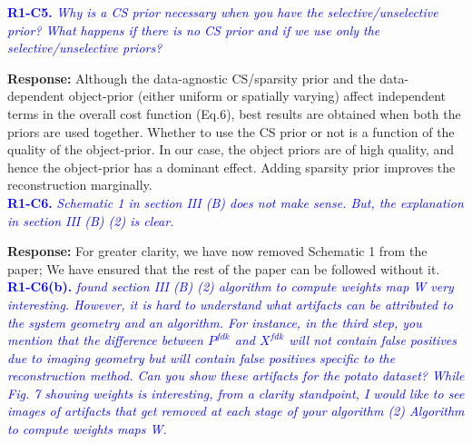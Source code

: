 \documentclass{article}
\begin{document}
\textcolor{blue}{\textbf{R1-C5.} \textit{ Why is a CS prior necessary when you have the selective/unselective prior? What happens if there is no CS prior and if we use only the selective/unselective priors?}}

\textbf{Response:} Although the data-agnostic CS/sparsity  prior and the data-dependent object-prior  (either uniform or spatially varying) affect independent terms in the overall cost function (Eq.6), best results are obtained when both the priors are used together. Whether to use the CS prior or not is a function of the quality of the object-prior. In our case, the object priors are of high quality, and hence the object-prior has a dominant effect. Adding sparsity prior improves the reconstruction marginally.\\

\textcolor{blue}{\textbf{R1-C6.}\textit{ Schematic 1 in section III (B) does not make sense. But, the explanation in section III (B) (2) is clear.}}

\textbf{Response:}  For greater clarity, we have now removed Schematic 1 from the paper; We have  ensured that the rest of the paper can be followed without it.\\

\textcolor{blue}{\textbf{R1-C6(b).}\textit{ found section III (B) (2) algorithm to compute weights map W very interesting. However, it is hard to understand what artifacts can be attributed to the system geometry and an algorithm. For instance, in the third step, you mention that the difference between $P^{fdk}$ and $X^{fdk}$ will not contain false positives due to imaging geometry but will contain false positives specific to the reconstruction method. Can you show these artifacts for the potato dataset? While Fig. 7 showing weights is interesting, from a clarity standpoint, I would like to see images of artifacts that get removed at each stage of your algorithm (2) Algorithm to compute weights maps W.}}
\end{document}
